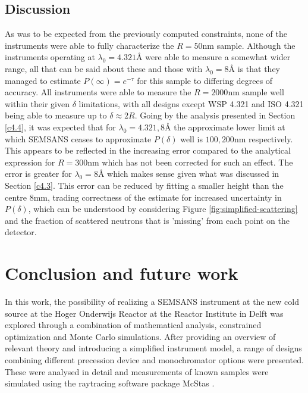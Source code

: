 \documentclass{article}
\begin{document}
\subsection{Discussion}
As was to be expected from the previously computed constraints, none of the instruments were able to fully characterize the $R=50\unit{\nano\meter}$ sample. Although the instruments operating at $\lambda_0 = 4.321$Å were able to measure a somewhat wider range, all that can be said about these and those with $\lambda_0 = 8$Å is that they managed to estimate $P(\infty) = e^{-\tau}$ for this sample to differing degrees of accuracy. All instruments were able to measure the $R = 2000 \unit{\nano\meter}$ sample well within their given $\delta$ limitations, with all designs except WSP 4.321 and ISO 4.321 being able to measure up to $\delta \approx 2R$. Going by the analysis presented in Section \ref{c4.4}, it was expected that for $\lambda_0 = 4.321, 8$Å the approximate lower limit at which SEMSANS ceases to approximate $P(\delta)$ well is $100, 200\unit{\nano\meter}$ respectively. This appears to be reflected in the increasing error compared to the analytical expression for $R = 300\unit{\nano\meter}$ which has not been corrected for such an effect. The error is greater for $\lambda_0 = 8$Å which makes sense given what was discussed in Section \ref{c4.3}. This error can be reduced by fitting a smaller height than the centre $8\unit{\milli\meter}$, trading correctness of the estimate for increased uncertainty in $P(\delta)$, which can be understood by considering Figure \ref{fig:simplified-scattering} and the fraction of scattered neutrons that is 'missing' from each point on the detector. 


\newpage
\section{Conclusion and future work}
In this work, the possibility of realizing a SEMSANS instrument at the new cold source at the Hoger Onderwijs Reactor at the Reactor Institute in Delft was explored through a combination of mathematical analysis, constrained optimization and Monte Carlo simulations. After providing an overview of relevant theory and introducing a simplified instrument model, a range of designs combining different precession device and monochromator options were presented. These were analysed in detail and measurements of known samples were simulated using the raytracing software package McStas \cite{willendrup2020}. 
\end{document}
